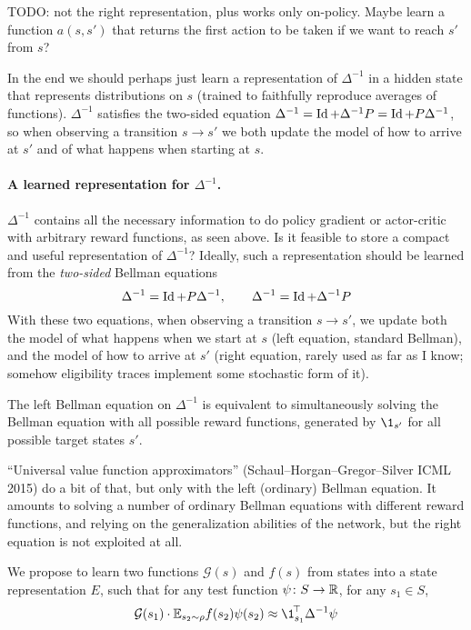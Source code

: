 \documentclass[11pt,a4paper]{article}
\newcommand{\green}{\mathcal{G}}
\begin{document}
TODO: not the right representation, plus works only on-policy. Maybe learn a function $a(s,s')$ that
returns the first action to be taken if we want to reach $s'$ from $s$?

In the end we should perhaps just learn a representation of $\Delta^{-1}$
in a hidden state that represents distributions on $s$ (trained to
faithfully reproduce averages of functions). $\Delta^{-1}$ satisfies the
two-sided equation $\Delta^{-1}=\operatorname{Id}+\Delta^{-1}P=\operatorname{Id}+P\Delta^{-1}$, so
when observing a transition $s\to s'$ we both update the model of
how to arrive at $s'$ and of what happens when starting at $s$.

\paragraph{A learned representation for $\Delta^{-1}$.} $\Delta^{-1}$
contains all the necessary information to do policy gradient or actor-critic with
arbitrary reward functions, as seen above. Is it feasible to store a
compact and useful representation of $\Delta^{-1}$? Ideally, such a
representation should be learned from the \emph{two-sided} Bellman
equations
\begin{equation}
\label{eq:greenbell}
\Delta^{-1}=\operatorname{Id} + P \Delta^{-1},\qquad \Delta^{-1}=\operatorname{Id} + \Delta^{-1}P
\end{equation}
With these two equations, when observing a transition $s\to s'$, we update
both the model of what happens when we start at $s$ (left equation,
standard Bellman), and the model of how to arrive at $s'$ (right
equation, rarely used as far as I know; somehow eligibility traces
implement some stochastic form of it).

The left Bellman equation on $\Delta^{-1}$ is equivalent to
simultaneously solving the Bellman equation with all possible reward
functions, generated by $\1_{s'}$ for all possible target states $s'$.

``Universal value function approximators'' (Schaul--Horgan--Gregor--Silver ICML 2015) do a bit of that, but only
with the left (ordinary) Bellman equation. It amounts to solving a number
of
ordinary Bellman equations with different reward functions, and relying on the generalization
abilities of the network, but the right equation is not exploited at all.

We propose to learn two functions $\green(s)$ and $f(s)$ from states into
a state representation $E$, such that for any test function $\psi\colon
S\to {\mathbb{R}}$, for any $s_1\in S$,
\begin{equation}
\label{eq:greenrep}
\green(s_1)\cdot \E_{s_2\sim \rho}
f(s_2)\psi(s_2)\approx \transp{\1_{s_1}}\,\Delta^{-1} \psi
\end{equation}
\end{document}

